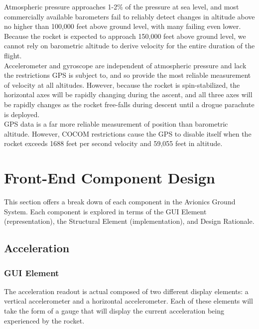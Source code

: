 \documentclass[journal,10pt,onecolumn,compsoc]{IEEEtran}
\begin{document}
				\noindent Atmospheric pressure approaches 1-2\% of the pressure at sea level, and most commercially available barometers fail to reliably detect changes in altitude above no higher than 100,000 feet above ground level, with many failing even lower.
				Because the rocket is expected to approach 150,000 feet above ground level, we cannot rely on barometric altitude to derive velocity for the entire duration of the flight.\\

				\noindent Accelerometer and gyroscope are independent of atmospheric pressure and lack the restrictions GPS is subject to, and so provide the most reliable measurement of velocity at all altitudes.
				However, because the rocket is spin-stabilized, the horizontal axes will be rapidly changing during the ascent, and all three axes will be rapidly changes as the rocket free-falls during descent until a drogue parachute is deployed.\\

				\noindent GPS data is a far more reliable measurement of position than barometric altitude.
				However, COCOM restrictions cause the GPS to disable itself when the rocket exceeds 1688 feet per second velocity and 59,055 feet in altitude.
		\setlength\parindent{24pt}

\section{Front-End Component Design}
	\noindent This section offers a break down of each component in the Avionics Ground System.
	Each component is explored in terms of the GUI Element (representation), the Structural Element (implementation), and Design Rationale.

	\subsection{Acceleration}

		\subsubsection{GUI Element}
			The acceleration readout is actual composed of two different display elements: a vertical accelerometer and a horizontal accelerometer.
			Each of these elements will take the form of a gauge that will display the current acceleration being experienced by the rocket.
			
\end{document}
